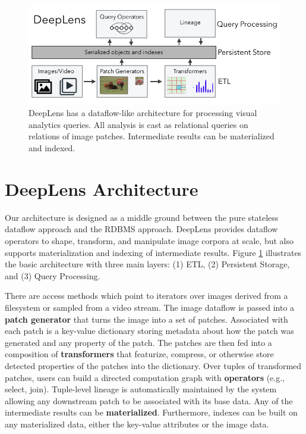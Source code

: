\begin{figure}[t]
\centering
 \includegraphics[width=\columnwidth]{figures/teaser.png}
 \caption{DeepLens has a dataflow-like architecture for processing visual analytics queries. All analysis is cast as relational queries on relations of image patches. Intermediate results can be materialized and indexed.  \label{teaser} }
\end{figure}

\section{DeepLens Architecture}
Our architecture is designed as a middle ground between the pure stateless dataflow approach and the RDBMS approach.
\textsf{DeepLens} provides dataflow operators to shape, transform, and manipulate image corpora at scale, but also supports materialization and indexing of intermediate results.
Figure \ref{teaser} illustrates the basic architecture with three main layers: (1) ETL, (2) Persistent Storage, and (3) Query Processing.

There are access methods which point to iterators over images derived from a filesystem or sampled from a video stream. The image dataflow is passed into a  \textbf{patch generator} that turns the image into a set of patches. Associated with each patch is a key-value dictionary storing metadata about how the patch was generated and any property of the patch. The patches are then fed into a composition of \textbf{transformers} that featurize, compress, or otherwise store detected properties of the patches into the dictionary. Over tuples of transformed patches, users can build a directed computation graph with \textbf{operators} (e.g., select, join).
Tuple-level lineage is automatically maintained by the system allowing any downstream patch to be associated with its base data.
Any of the intermediate results can be \textbf{materialized}. 
Furthermore, indexes can be built on any materialized data, either the key-value attributes or the image data.

